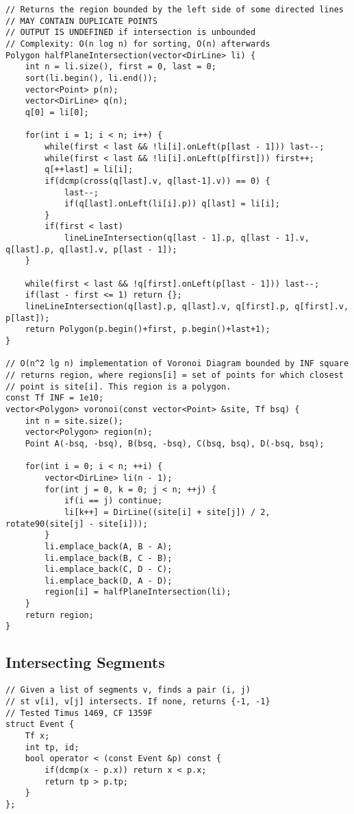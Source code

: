 \documentclass[FSZ,a4paper,onesided]{article}
\begin{document}
\begin{multicols*}{\COLS}
\begin{lstlisting}
// Returns the region bounded by the left side of some directed lines
// MAY CONTAIN DUPLICATE POINTS
// OUTPUT IS UNDEFINED if intersection is unbounded
// Complexity: O(n log n) for sorting, O(n) afterwards
Polygon halfPlaneIntersection(vector<DirLine> li) {
    int n = li.size(), first = 0, last = 0;
    sort(li.begin(), li.end());
    vector<Point> p(n);
    vector<DirLine> q(n);
    q[0] = li[0];

    for(int i = 1; i < n; i++) {
        while(first < last && !li[i].onLeft(p[last - 1])) last--;
        while(first < last && !li[i].onLeft(p[first])) first++;
        q[++last] = li[i];
        if(dcmp(cross(q[last].v, q[last-1].v)) == 0) {
            last--;
            if(q[last].onLeft(li[i].p)) q[last] = li[i];
        }
        if(first < last)
            lineLineIntersection(q[last - 1].p, q[last - 1].v, q[last].p, q[last].v, p[last - 1]);
    }

    while(first < last && !q[first].onLeft(p[last - 1])) last--;
    if(last - first <= 1) return {};
    lineLineIntersection(q[last].p, q[last].v, q[first].p, q[first].v, p[last]);
    return Polygon(p.begin()+first, p.begin()+last+1);
}

// O(n^2 lg n) implementation of Voronoi Diagram bounded by INF square
// returns region, where regions[i] = set of points for which closest
// point is site[i]. This region is a polygon.
const Tf INF = 1e10;
vector<Polygon> voronoi(const vector<Point> &site, Tf bsq) {
    int n = site.size();
    vector<Polygon> region(n);
    Point A(-bsq, -bsq), B(bsq, -bsq), C(bsq, bsq), D(-bsq, bsq);

    for(int i = 0; i < n; ++i) {
        vector<DirLine> li(n - 1);
        for(int j = 0, k = 0; j < n; ++j) {
            if(i == j) continue;
            li[k++] = DirLine((site[i] + site[j]) / 2, rotate90(site[j] - site[i]));
        }
        li.emplace_back(A, B - A);
        li.emplace_back(B, C - B);
        li.emplace_back(C, D - C);
        li.emplace_back(D, A - D);
        region[i] = halfPlaneIntersection(li);
    }
    return region;
}\end{lstlisting}
\subsection{Intersecting Segments}
\begin{lstlisting}
// Given a list of segments v, finds a pair (i, j)
// st v[i], v[j] intersects. If none, returns {-1, -1}
// Tested Timus 1469, CF 1359F
struct Event {
    Tf x;
    int tp, id;
    bool operator < (const Event &p) const {
        if(dcmp(x - p.x)) return x < p.x;
        return tp > p.tp;
    }
};


\end{lstlisting}
\end{multicols*}
\end{document}
